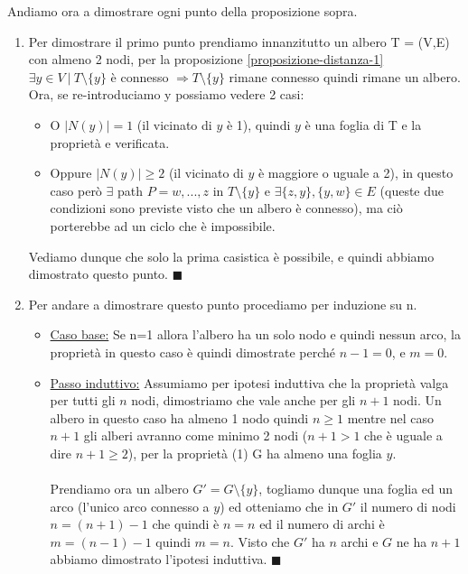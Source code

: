 \begin{demostration}
Andiamo ora a dimostrare ogni punto della proposizione sopra.
\begin{enumerate}
    \item Per dimostrare il primo punto prendiamo innanzitutto un albero T = (V,E) con almeno 2 nodi, per la proposizione \ref{proposizione-distanza-1} $\exists y \in V \: |\: T \setminus \{y\}$ è connesso $\Longrightarrow T \setminus \{y\}$ rimane connesso quindi rimane un albero.\\
    Ora, se re-introduciamo y possiamo vedere 2 casi:
    \begin{itemize}
        \item O $|N(y)| = 1$ (il vicinato di $y$ è 1), quindi $y$ è una foglia di T e la proprietà e verificata.
        \item Oppure $|N(y)| \geq 2$ (il vicinato di $y$ è maggiore o uguale a 2), in questo caso però $\exists$ path $P = w,...,z$ in $T \setminus \{y\}$ e $\exists \{z,y\}, \{y,w\} \in E$ (queste due condizioni sono previste visto che un albero è connesso), ma ciò porterebbe ad un ciclo che è impossibile.
    \end{itemize}
    Vediamo dunque che solo la prima casistica è possibile, e quindi abbiamo dimostrato questo punto. $\blacksquare$
    \item Per andare a dimostrare questo punto procediamo per induzione su n.
    \begin{itemize}
        \item \underline{Caso base:} Se n=1 allora l'albero ha un solo nodo e quindi nessun arco, la proprietà in questo caso è quindi dimostrate perché $n-1 = 0$, e $m=0$.
        \item \underline{Passo induttivo:} Assumiamo per ipotesi induttiva che la proprietà valga per tutti gli $n$ nodi, dimostriamo che vale anche per gli $n+1$ nodi. Un albero in questo caso ha almeno 1 nodo quindi $n \geq 1$ mentre nel caso $n+1$ gli alberi avranno come minimo 2 nodi ($n+1 > 1$ che è uguale a dire $n + 1 \geq 2$), per la proprietà (1) G ha almeno una foglia $y$.\\\\
        Prendiamo ora un albero $G' = G \setminus \{y\}$, togliamo dunque una foglia ed un arco (l'unico arco connesso a $y$) ed otteniamo che in $G'$ il numero di nodi $n = (n + 1)-1$ che quindi è $n = n$ ed il numero di archi è $m = (n-1)-1$ quindi $m = n$. Visto che $G'$ ha $n$ archi e $G$ ne ha $n+1$ abbiamo dimostrato l'ipotesi induttiva. $\blacksquare$
    \end{itemize}

\end{enumerate}
\end{demostration}
